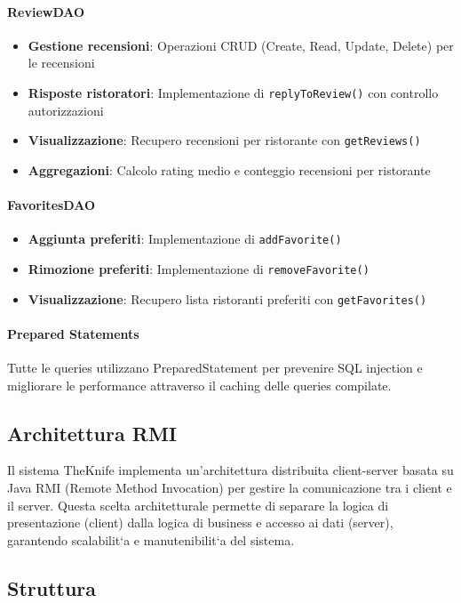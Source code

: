 \paragraph{ReviewDAO}
\begin{itemize}
    \item \textbf{Gestione recensioni}: Operazioni CRUD (Create, Read, Update, Delete) per le recensioni
    \item \textbf{Risposte ristoratori}: Implementazione di \texttt{replyToReview()} con controllo autorizzazioni
    \item \textbf{Visualizzazione}: Recupero recensioni per ristorante con \texttt{getReviews()}
    \item \textbf{Aggregazioni}: Calcolo rating medio e conteggio recensioni per ristorante
\end{itemize}

\paragraph{FavoritesDAO}
\begin{itemize}
    \item \textbf{Aggiunta preferiti}: Implementazione di \texttt{addFavorite()}
    \item \textbf{Rimozione preferiti}: Implementazione di \texttt{removeFavorite()}
    \item \textbf{Visualizzazione}: Recupero lista ristoranti preferiti con \texttt{getFavorites()}
\end{itemize}

\paragraph{Prepared Statements}
Tutte le queries utilizzano PreparedStatement per prevenire SQL injection e migliorare le performance attraverso il caching delle queries compilate.

\subsection{Architettura RMI}
\label{sec:rmi}
Il sistema TheKnife implementa un'architettura distribuita client-server basata su Java
RMI (Remote Method Invocation) per gestire la comunicazione tra i client e il server.
Questa scelta architetturale permette di separare la logica di presentazione (client) dalla
logica di business e accesso ai dati (server), garantendo scalabilit`a e manutenibilit`a del
sistema.
\subsection{Struttura}
